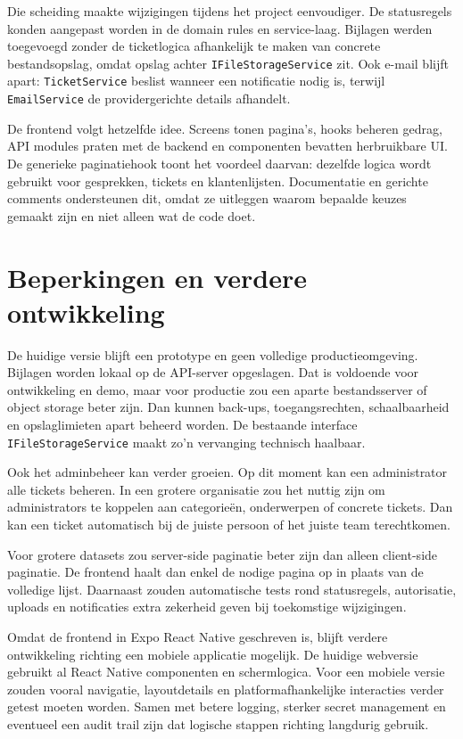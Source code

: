 Die scheiding maakte wijzigingen tijdens het project eenvoudiger. De statusregels konden aangepast worden in de domain rules en service-laag. Bijlagen werden toegevoegd zonder de ticketlogica afhankelijk te maken van concrete bestandsopslag, omdat opslag achter \texttt{IFileStorageService} zit. Ook e-mail blijft apart: \texttt{TicketService} beslist wanneer een notificatie nodig is, terwijl \texttt{EmailService} de providergerichte details afhandelt.

De frontend volgt hetzelfde idee. Screens tonen pagina's, hooks beheren gedrag, API modules praten met de backend en componenten bevatten herbruikbare UI. De generieke paginatiehook toont het voordeel daarvan: dezelfde logica wordt gebruikt voor gesprekken, tickets en klantenlijsten. Documentatie en gerichte comments ondersteunen dit, omdat ze uitleggen waarom bepaalde keuzes gemaakt zijn en niet alleen wat de code doet.

\section{Beperkingen en verdere ontwikkeling}

De huidige versie blijft een prototype en geen volledige productieomgeving. Bijlagen worden lokaal op de API-server opgeslagen. Dat is voldoende voor ontwikkeling en demo, maar voor productie zou een aparte bestandsserver of object storage beter zijn. Dan kunnen back-ups, toegangsrechten, schaalbaarheid en opslaglimieten apart beheerd worden. De bestaande interface \texttt{IFileStorageService} maakt zo'n vervanging technisch haalbaar.

Ook het adminbeheer kan verder groeien. Op dit moment kan een administrator alle tickets beheren. In een grotere organisatie zou het nuttig zijn om administrators te koppelen aan categorieën, onderwerpen of concrete tickets. Dan kan een ticket automatisch bij de juiste persoon of het juiste team terechtkomen.

Voor grotere datasets zou server-side paginatie beter zijn dan alleen client-side paginatie. De frontend haalt dan enkel de nodige pagina op in plaats van de volledige lijst. Daarnaast zouden automatische tests rond statusregels, autorisatie, uploads en notificaties extra zekerheid geven bij toekomstige wijzigingen.

Omdat de frontend in Expo React Native geschreven is, blijft verdere ontwikkeling richting een mobiele applicatie mogelijk. De huidige webversie gebruikt al React Native componenten en schermlogica. Voor een mobiele versie zouden vooral navigatie, layoutdetails en platformafhankelijke interacties verder getest moeten worden. Samen met betere logging, sterker secret management en eventueel een audit trail zijn dat logische stappen richting langdurig gebruik.
